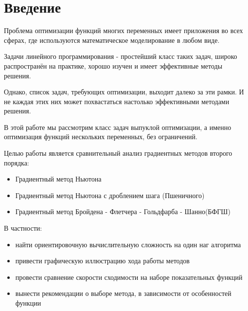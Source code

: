 \section{Введение}
\label{sec:introduction}
Проблема оптимизации функций многих переменных имеет приложения во всех сферах, где используются математическое моделирование в любом виде.

Задачи линейного программирования - простейший класс таких задач, широко распространён на практике, хорошо изучен и имеет эффективные методы решения.

Однако, список задач, требующих оптимизации, выходит далеко за эти рамки.
И не каждая этих них может похвастаться настолько эффективными методами решения.

В этой работе мы рассмотрим класс задач выпуклой оптимизации, а именно оптимизация функций нескольких переменных, без ограничений.

Целью работы является сравнительный анализ градиентных методов второго порядка:

\begin{itemize}
    \item Градиентный метод Ньютона
    \item Градиентный метод Ньютона с дроблением шага (Пшеничного)
    \item Градиентный метод Бройдена - Флетчера - Гольдфарба - Шанно(БФГШ)
\end{itemize}


В частности:
\begin{itemize}
    \item найти ориентировочную вычислительную сложность на один наг алгоритма
    \item привести графическую иллюстрацию хода работы методов
    \item провести сравнение скорости сходимости на наборе показательных функций
    \item вынести рекомендации о выборе метода, в зависимости от особенностей функции
\end{itemize}

